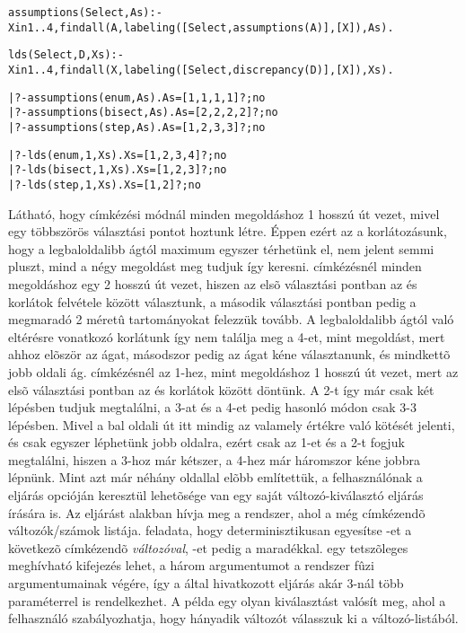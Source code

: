 \begin{alltt}
% a Select címkézési mód használatával megkeresi az X in 1..4 korlát összes
% megoldását, és a megoldásokhoz vezetõ utak hosszát As-ben adja vissza
assumptions(Select, As) :-
     X in 1..4, findall(A, labeling([Select, assumptions(A)], [X]), As).

% a Select címkézési mód és D eltérés-korlát használatával megkeresi az
% X in 1..4 korlát összes megoldását, és a megtalált megoldásokat visszaadja
% Xs-ben
lds(Select, D, Xs) :-
     X in 1..4, findall(X, labeling([Select, discrepancy(D)], [X]), Xs).

| ?- assumptions(enum, As).          As = [1,1,1,1] ? ; no
| ?- assumptions(bisect, As).        As = [2,2,2,2] ? ; no
| ?- assumptions(step, As).          As = [1,2,3,3] ? ; no 
                                                                          
| ?- lds(enum, 1, Xs).               Xs = [1,2,3,4] ? ; no 
| ?- lds(bisect, 1, Xs).             Xs = [1,2,3] ? ; no 
| ?- lds(step, 1, Xs).               Xs = [1,2] ? ; no 
\end{alltt}

Látható, hogy  címkézési módnál minden megoldáshoz 1 hosszú út vezet,
mivel egy többszörös választási pontot hoztunk létre. Éppen ezért az a korlátozásunk,
hogy a legbaloldalibb ágtól maximum egyszer térhetünk el, nem jelent semmi pluszt,
mind a négy megoldást meg tudjuk így keresni.
\br
{} címkézésnél minden megoldáshoz egy 2 hosszú út vezet, hiszen az
elsõ választási pontban az  és  korlátok felvétele között
választunk, a második választási pontban pedig a megmaradó 2 méretû tartományokat
felezzük tovább. A legbaloldalibb ágtól való eltérésre vonatkozó korlátunk így nem
találja meg a 4-et, mint megoldást, mert ahhoz elõször az  ágat, másodszor
pedig az  ágat kéne választanunk, és mindkettõ jobb oldali ág.
\br
{} címkézésnél az 1-hez, mint megoldáshoz 1 hosszú út vezet, mert az elsõ
választási pontban az  és  korlátok között döntünk. A 2-t így
már csak két lépésben tudjuk megtalálni, a 3-at és a 4-et pedig hasonló módon csak
3-3 lépésben. Mivel a bal oldali út itt mindig az  valamely értékre való kötését
jelenti, és csak egyszer léphetünk jobb oldalra, ezért csak az 1-et és a 2-t fogjuk
megtalálni, hiszen a 3-hoz már kétszer, a 4-hez már háromszor kéne jobbra lépnünk.
\br
\label{variable:sel}
Mint azt már néhány oldallal elõbb említettük, a felhasználónak a 
eljárás  opcióján keresztül lehetõsége van egy saját változó-kiválasztó
eljárás írására is. Az eljárást  alakban hívja meg a rendszer,
ahol  a még címkézendõ változók/számok listája.  feladata, hogy
determinisztikusan egyesítse -et a következõ címkézendõ \emph{változóval},
-et pedig a maradékkal.  egy tetszõleges meghívható kifejezés lehet,
a három argumentumot a rendszer fûzi  argumentumainak végére, így a 
által hivatkozott eljárás akár 3-nál több paraméterrel is rendelkezhet. A példa egy olyan
kiválasztást valósít meg, ahol a felhasználó szabályozhatja, hogy hányadik változót
válasszuk ki a változó-listából.

